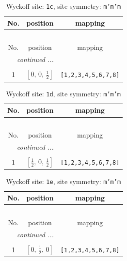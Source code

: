 \documentclass[fleqn,8pt]{jsarticle}
\begin{document}
\begin{longtable}{ccc}
\caption{Wyckoff site: {\tt 1c}, site symmetry: {\tt m'm'm}}
 \\
 \hline \hline
No. & position & mapping \\ \hline \endfirsthead

\multicolumn{2}{l}{\tablename\ \thetable{}} \\
 \hline \hline
No. & position & mapping \\ \hline \endhead

 \hline \hline
\multicolumn{2}{r}{\footnotesize\it continued ...} \\ \endfoot

 \hline \hline
\multicolumn{2}{r}{} \\ \endlastfoot

1 & $\left[ 0,\, 0,\, \frac{1}{2} \right]$ & {\tt [1,2,3,4,5,6,7,8]} \\
\end{longtable}
\renewcommand{\arraystretch}{1.2}
\begin{longtable}{ccc}
\caption{Wyckoff site: {\tt 1d}, site symmetry: {\tt m'm'm}}
 \\
 \hline \hline
No. & position & mapping \\ \hline \endfirsthead

\multicolumn{2}{l}{\tablename\ \thetable{}} \\
 \hline \hline
No. & position & mapping \\ \hline \endhead

 \hline \hline
\multicolumn{2}{r}{\footnotesize\it continued ...} \\ \endfoot

 \hline \hline
\multicolumn{2}{r}{} \\ \endlastfoot

1 & $\left[ \frac{1}{2},\, 0,\, \frac{1}{2} \right]$ & {\tt [1,2,3,4,5,6,7,8]} \\
\end{longtable}
\renewcommand{\arraystretch}{1.2}
\begin{longtable}{ccc}
\caption{Wyckoff site: {\tt 1e}, site symmetry: {\tt m'm'm}}
 \\
 \hline \hline
No. & position & mapping \\ \hline \endfirsthead

\multicolumn{2}{l}{\tablename\ \thetable{}} \\
 \hline \hline
No. & position & mapping \\ \hline \endhead

 \hline \hline
\multicolumn{2}{r}{\footnotesize\it continued ...} \\ \endfoot

 \hline \hline
\multicolumn{2}{r}{} \\ \endlastfoot

1 & $\left[ 0,\, \frac{1}{2},\, 0 \right]$ & {\tt [1,2,3,4,5,6,7,8]} \\
\end{longtable}
\end{document}
